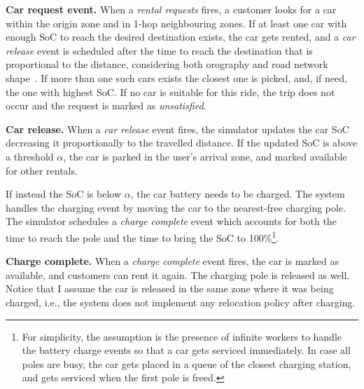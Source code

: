 \textbf{Car request event.}
When a \emph{rental requests} fires, a customer looks for a car within the origin zone and in 1-hop neighbouring zones.
If at least one car with enough SoC to reach the desired destination exists, the car gets rented, and a \emph{car release} event is scheduled after the time to reach the destination that is proportional to the distance, considering both orography and road network shape~\cite{8_cocca2019free}. If more than one such cars exists the closest one is picked, and, if need, the one with highest SoC.  
If no car is suitable for this ride, the trip does not occur and the request is marked as \emph{unsatisfied}.



\textbf{Car release.}
When a \emph{car release} event fires, the simulator updates the car SoC decreasing it proportionally to the travelled distance.
If the updated SoC is above a threshold $\alpha$, the car is parked in the user's arrival zone, and marked available for other rentals.

If instead the SoC is below $\alpha$, the car battery needs to be charged. The system handles the charging event by moving the car to the nearest-free charging pole. The simulator schedules a \emph{charge complete} event which accounts for both the time to reach the pole and the time to bring the SoC to 100\%\footnote{For simplicity, the assumption is the presence of infinite workers to handle the battery charge events so that a car gets serviced immediately. In case all poles are busy, the car gets placed in a queue of the closest charging station, and gets serviced when the first pole is freed.}.





\textbf{Charge complete.} When a \emph{charge complete} event fires, the car is marked as available, and customers can rent it again. The charging pole is released as well.  
Notice that I assume the car is released in the same zone where it was being charged, i.e., the system does not implement any relocation policy after charging.


